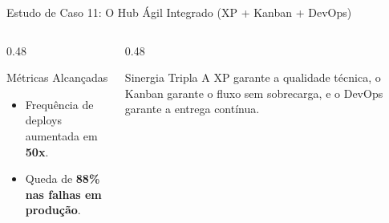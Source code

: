 \documentclass[aspectratio=169, 9pt]{beamer}
\begin{document}
\begin{frame}{Estudo de Caso 11: O Hub Ágil Integrado (XP + Kanban + DevOps)}
  \begin{columns}[T]
    \begin{column}{0.48\textwidth}
      \begin{exampleblock}{Métricas Alcançadas}
        \begin{itemize}
          \item Frequência de deploys aumentada em \textbf{50x}.
          \item Queda de \textbf{88\% nas falhas em produção}.
        \end{itemize}
      \end{exampleblock}
    \end{column}

    \begin{column}{0.48\textwidth}
      \begin{alertblock}{Sinergia Tripla}
        A XP garante a qualidade técnica, o Kanban garante o fluxo sem sobrecarga, e o DevOps garante a entrega contínua.
      \end{alertblock}
    \end{column}
  \end{columns}
\end{frame}
\end{document}
